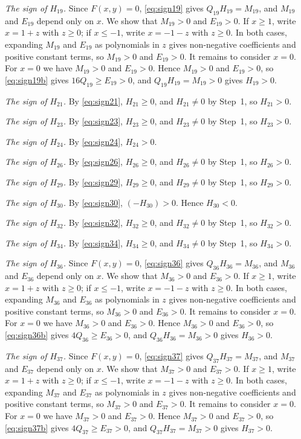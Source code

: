 \documentclass[11pt]{article}
\begin{document}
\emph{The sign of $H_{19}$.} Since $F(x,y)=0$, \eqref{eq:sign19} gives $Q_{19}H_{19}=M_{19}$, and $M_{19}$ and $E_{19}$ depend only on $x$. We show that $M_{19}>0$ and $E_{19}>0$. If $x\geq1$, write $x=1+z$ with $z\geq0$; if $x\leq-1$, write $x=-1-z$ with $z\geq0$. In both cases, expanding $M_{19}$ and $E_{19}$ as polynomials in $z$ gives non-negative coefficients and positive constant terms, so $M_{19}>0$ and $E_{19}>0$. It remains to consider $x=0$. For $x=0$ we have $M_{19}>0$ and $E_{19}>0$. Hence $M_{19}>0$ and $E_{19}>0$, so \eqref{eq:sign19b} gives $16Q_{19}\geq E_{19}>0$, and $Q_{19}H_{19}=M_{19}>0$ gives $H_{19}>0$.

\emph{The sign of $H_{21}$.} By \eqref{eq:sign21}, $H_{21}\geq0$, and $H_{21}\neq0$ by Step~1, so $H_{21}>0$.

\emph{The sign of $H_{23}$.} By \eqref{eq:sign23}, $H_{23}\geq0$, and $H_{23}\neq0$ by Step~1, so $H_{23}>0$.

\emph{The sign of $H_{24}$.} By \eqref{eq:sign24}, $H_{24}>0$.

\emph{The sign of $H_{26}$.} By \eqref{eq:sign26}, $H_{26}\geq0$, and $H_{26}\neq0$ by Step~1, so $H_{26}>0$.

\emph{The sign of $H_{29}$.} By \eqref{eq:sign29}, $H_{29}\geq0$, and $H_{29}\neq0$ by Step~1, so $H_{29}>0$.

\emph{The sign of $H_{30}$.} By \eqref{eq:sign30}, $(-H_{30})>0$. Hence $H_{30}<0$.

\emph{The sign of $H_{32}$.} By \eqref{eq:sign32}, $H_{32}\geq0$, and $H_{32}\neq0$ by Step~1, so $H_{32}>0$.

\emph{The sign of $H_{34}$.} By \eqref{eq:sign34}, $H_{34}\geq0$, and $H_{34}\neq0$ by Step~1, so $H_{34}>0$.

\emph{The sign of $H_{36}$.} Since $F(x,y)=0$, \eqref{eq:sign36} gives $Q_{36}H_{36}=M_{36}$, and $M_{36}$ and $E_{36}$ depend only on $x$. We show that $M_{36}>0$ and $E_{36}>0$. If $x\geq1$, write $x=1+z$ with $z\geq0$; if $x\leq-1$, write $x=-1-z$ with $z\geq0$. In both cases, expanding $M_{36}$ and $E_{36}$ as polynomials in $z$ gives non-negative coefficients and positive constant terms, so $M_{36}>0$ and $E_{36}>0$. It remains to consider $x=0$. For $x=0$ we have $M_{36}>0$ and $E_{36}>0$. Hence $M_{36}>0$ and $E_{36}>0$, so \eqref{eq:sign36b} gives $4Q_{36}\geq E_{36}>0$, and $Q_{36}H_{36}=M_{36}>0$ gives $H_{36}>0$.

\emph{The sign of $H_{37}$.} Since $F(x,y)=0$, \eqref{eq:sign37} gives $Q_{37}H_{37}=M_{37}$, and $M_{37}$ and $E_{37}$ depend only on $x$. We show that $M_{37}>0$ and $E_{37}>0$. If $x\geq1$, write $x=1+z$ with $z\geq0$; if $x\leq-1$, write $x=-1-z$ with $z\geq0$. In both cases, expanding $M_{37}$ and $E_{37}$ as polynomials in $z$ gives non-negative coefficients and positive constant terms, so $M_{37}>0$ and $E_{37}>0$. It remains to consider $x=0$. For $x=0$ we have $M_{37}>0$ and $E_{37}>0$. Hence $M_{37}>0$ and $E_{37}>0$, so \eqref{eq:sign37b} gives $4Q_{37}\geq E_{37}>0$, and $Q_{37}H_{37}=M_{37}>0$ gives $H_{37}>0$.
\end{document}

